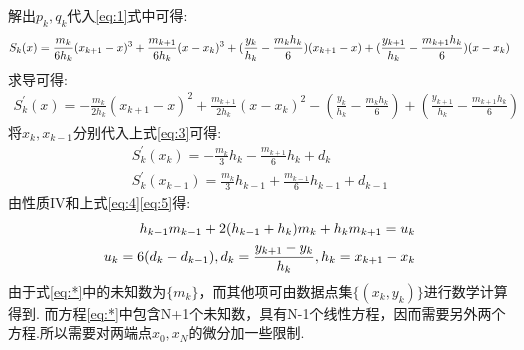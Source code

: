 \documentclass[UTF8]{ctexart}
\begin{document}
解出$p_k,q_k$代入\ref{eq:1}式中可得:
\begin{align}
	S_k(x)=\frac{m_k}{6h_k}(x_{k+1}-x)^3+\frac{m_{k+1}}{6h_k}(x-x_k)^3+(\frac{y_k}{h_k}-\frac{m_k h_k}{6})(x_{k+1}-x)+(\frac{y_{k+1}}{h_k}-\frac{m_{k+1}h_k}{6})(x-x_k) \notag
\end{align}
求导可得:
\begin{align}
	S_k^{'}(x)=-\frac{m_k}{2h_k}(x_{k+1}-x)^2+\frac{m_{k+1}}{2h_k}(x-x_k)^2-(\frac{y_k}{h_k}-\frac{m_k h_k}{6})+(\frac{y_{k+1}}{h_k}-\frac{m_{k+1}h_k}{6}) \label{eq:3}
\end{align}
将$x_k,x_{k-1}$分别代入上式\ref{eq:3}可得:
\begin{align}
	S_k^{'}(x_k)=-\frac{m_k}{3}h_k-\frac{m_{k+1}}{6}h_k+d_k \label{eq:4}\\
	S_k^{'}(x_{k-1})=\frac{m_k}{3}h_{k-1}+\frac{m_{k-1}}{6}h_{k-1}+d_{k-1} \label{eq:5}
\end{align}
由性质IV和上式\ref{eq:4}\ref{eq:5}得:
\begin{align}
	h_{k-1}m_{k-1}+2(h_{k-1}+h_k)m_k+h_km_{k+1}=u_k \label{eq:*}\\
	u_k=6(d_k-d_{k-1}),d_k=\frac{y_{k+1}-y_k}{h_k},h_k=x_{k+1}-x_k \notag
\end{align}
由于式\ref{eq:*}中的未知数为$\{m_k\}$，而其他项可由数据点集$\{(x_k,y_k)\}$进行数学计算得到.
而方程\ref{eq:*}中包含N+1个未知数，具有N-1个线性方程，因而需要另外两个方程.所以需要对两端点$x_0,x_N$的微分加一些限制.\\
\end{document}
